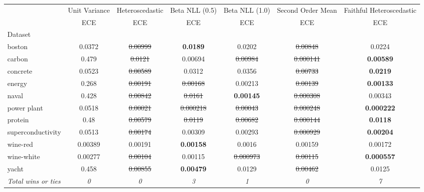 \begin{tabular}{l|c|c|c|c|c|c}
\toprule
{} & {Unit Variance} & {Heteroscedastic} & {Beta NLL (0.5)} & {Beta NLL (1.0)} & {Second Order Mean} & {Faithful Heteroscedastic} \\
{} & {ECE} & {ECE} & {ECE} & {ECE} & {ECE} & {ECE} \\
{Dataset} & {} & {} & {} & {} & {} & {} \\
\midrule
boston & 0.0372 & \sout{0.00999} & \textbf{0.0189} & 0.0202 & \sout{0.00848} & 0.0224 \\
carbon & 0.479 & \sout{0.0121} & 0.00694 & \sout{0.00984} & \sout{0.000141} & \textbf{0.00589} \\
concrete & 0.0523 & \sout{0.00589} & 0.0312 & 0.0356 & \sout{0.00733} & \textbf{0.0219} \\
energy & 0.268 & \sout{0.00191} & \sout{0.00168} & 0.00213 & \sout{0.00139} & \textbf{0.00133} \\
naval & 0.428 & \sout{0.00842} & \sout{0.0161} & \textbf{0.00145} & \sout{0.000308} & 0.00343 \\
power plant & 0.0518 & \sout{0.00021} & \sout{0.000218} & \sout{0.00043} & \sout{0.000248} & \textbf{0.000222} \\
protein & 0.48 & \sout{0.00579} & \sout{0.0119} & \sout{0.00682} & \sout{0.000144} & \textbf{0.0118} \\
superconductivity & 0.0513 & \sout{0.00174} & 0.00309 & 0.00293 & \sout{0.000929} & \textbf{0.00204} \\
wine-red & 0.00389 & 0.00191 & \textbf{0.00158} & 0.0016 & 0.00159 & 0.00172 \\
wine-white & 0.00277 & \sout{0.00104} & 0.00115 & \sout{0.000973} & \sout{0.00115} & \textbf{0.000557} \\
yacht & 0.458 & \sout{0.00855} & \textbf{0.00479} & 0.0129 & \sout{0.00462} & 0.0125 \\
\textit{{Total wins or ties}} & \textit{0} & \textit{0} & \textit{3} & \textit{1} & \textit{0} & \textit{7} \\
\bottomrule
\end{tabular}
